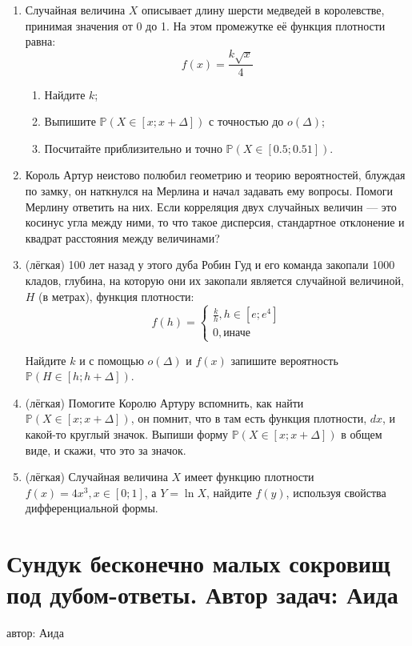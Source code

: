 \documentclass[a4paper,12pt]{article}
\def \P{\mathbb{P}}
\begin{document}
\begin{enumerate} %
\item Случайная величина $X$ описывает длину шерсти медведей в королевстве, принимая значения от 0 до 1. На этом промежутке её функция плотности равна:
\[
   f(x)= \frac{k\sqrt{x}}{4}
\]
\begin{enumerate}
\item Найдите $k$;
\item Выпишите $\P(X\in [x;x+\Delta])$ с точностью до $o(\Delta)$;
\item Посчитайте приблизительно и точно $\P(X\in [0.5;0.51])$.
\end{enumerate}
\item Король Артур неистово полюбил геометрию и теорию вероятностей, блуждая по замку, он наткнулся на Мерлина и начал задавать ему вопросы. Помоги Мерлину ответить на них. Если корреляция двух случайных величин — это косинус угла между ними, то что такое дисперсия, стандартное отклонение и квадрат расстояния между величинами?

\item (лёгкая) 100 лет назад у этого дуба Робин Гуд и его команда закопали 1000 кладов, глубина, на которую они их закопали является случайной величиной, $H$ (в метрах), функция плотности:
\[
   f(h)=
   \begin{cases}
   \frac{k}{h}, h\in[e ; e^4] \\
    0, \text{иначе}
    \end{cases}
\]

Найдите $k$ и с помощью $o(\Delta)$ и $f(x)$ запишите вероятность $\P(H \in [h; h + \Delta])$.
\item (лёгкая) Помогите Королю Артуру вспомнить, как найти $\P(X\in [x;x+\Delta])$, он помнит, что в там есть функция плотности, $dx$,  и какой-то круглый значок. Выпиши форму $\P(X\in [x;x+\Delta])$ в общем виде, и скажи, что это за значок.
\item (лёгкая)
Случайная величина $X$ имеет функцию плотности $f(x)=4x^3, x \in [0;1]$, а $Y=\ln{X}$, найдите $f(y)$, используя свойства дифференциальной формы.
\end{enumerate}

\newpage
\section{Сундук бесконечно малых сокровищ под дубом-ответы. Автор задач: Аида}
автор: Аида
\end{document}
